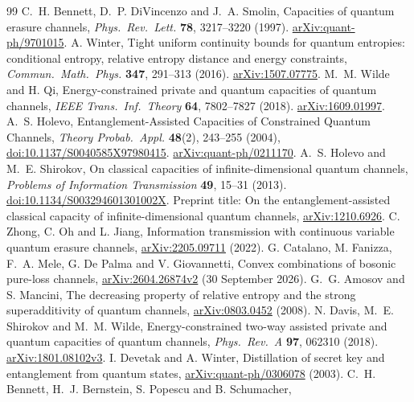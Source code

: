 \documentclass[11pt]{article}
\begin{document}
\begin{thebibliography}{99}
 C.~H. Bennett, D.~P. DiVincenzo and J.~A. Smolin,
Capacities of quantum erasure channels,
\emph{Phys.\ Rev.\ Lett.} \textbf{78}, 3217--3220 (1997).
\href{https://arxiv.org/abs/quant-ph/9701015}{arXiv:quant-ph/9701015}.
 A. Winter, Tight uniform continuity bounds for quantum
entropies: conditional entropy, relative entropy distance and energy
constraints, \emph{Commun.\ Math.\ Phys.} \textbf{347}, 291--313 (2016).
\href{https://arxiv.org/abs/1507.07775}{arXiv:1507.07775}.
 M.~M. Wilde and H. Qi, Energy-constrained private and quantum
capacities of quantum channels, \emph{IEEE Trans.\ Inf.\ Theory}
\textbf{64}, 7802--7827 (2018).
\href{https://arxiv.org/abs/1609.01997}{arXiv:1609.01997}.
 A.~S. Holevo, Entanglement-Assisted Capacities of Constrained
Quantum Channels, \emph{Theory Probab.\ Appl.} \textbf{48}(2), 243--255 (2004),
\href{https://doi.org/10.1137/S0040585X97980415}{doi:10.1137/S0040585X97980415}.
\href{https://arxiv.org/abs/quant-ph/0211170}{arXiv:quant-ph/0211170}.
 A.~S. Holevo and M.~E. Shirokov, On classical capacities of
infinite-dimensional quantum channels,
\emph{Problems of Information Transmission} \textbf{49}, 15--31 (2013).
\href{https://doi.org/10.1134/S003294601301002X}{doi:10.1134/S003294601301002X}.
Preprint title: On the entanglement-assisted classical capacity of
infinite-dimensional quantum channels,
\href{https://arxiv.org/abs/1210.6926}{arXiv:1210.6926}.
 C. Zhong, C. Oh and L. Jiang, Information transmission with
continuous variable quantum erasure channels,
\href{https://arxiv.org/abs/2205.09711}{arXiv:2205.09711} (2022).
 G. Catalano, M. Fanizza, F.~A. Mele, G. De Palma and
V. Giovannetti, Convex combinations of bosonic pure-loss channels,
\href{https://arxiv.org/abs/2604.26874v2}{arXiv:2604.26874v2}
(30 September 2026).
 G.~G. Amosov and S. Mancini, The decreasing property of
relative entropy and the strong superadditivity of quantum channels,
\href{https://arxiv.org/abs/0803.0452}{arXiv:0803.0452} (2008).
 N. Davis, M.~E. Shirokov and M.~M. Wilde,
Energy-constrained two-way assisted private and quantum capacities of
quantum channels, \emph{Phys.\ Rev.\ A} \textbf{97}, 062310 (2018).
\href{https://arxiv.org/abs/1801.08102v3}{arXiv:1801.08102v3}.
 I. Devetak and A. Winter, Distillation of secret key and
entanglement from quantum states,
\href{https://arxiv.org/abs/quant-ph/0306078}{arXiv:quant-ph/0306078} (2003).
 C.~H. Bennett, H.~J. Bernstein, S. Popescu and B. Schumacher,

\end{thebibliography}
\end{document}

